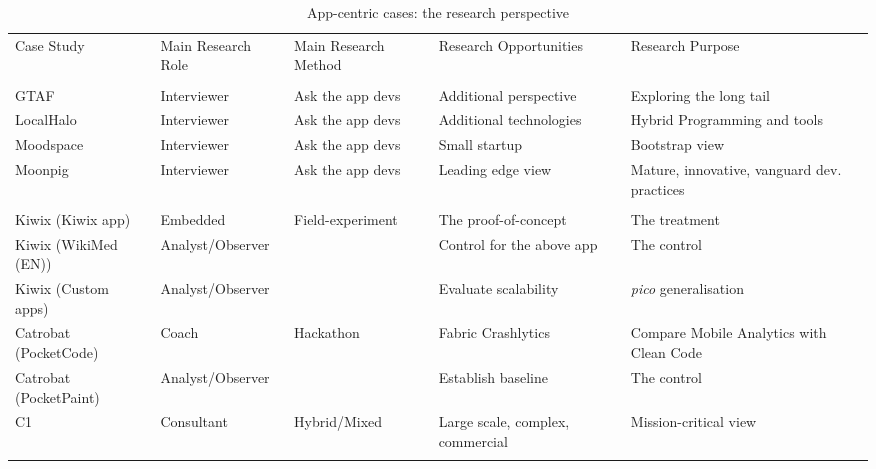 \begin{table}
    \centering
    \tabcolsep=0.06cm
    \tiny
    \begin{tabular}{lllp{3.5cm}p{3.5cm}}\toprule
    Case Study                 & Main Research Role &  Main Research Method   & Research Opportunities             & Research Purpose \\
    \arrayrulecolor{blue!70}\midrule
    \multicolumn{5}{c}{{\large Interviews}} \\    
    GTAF                       & Interviewer        & Ask the app devs & Additional perspective & Exploring the long tail \\
    LocalHalo                  & Interviewer        & Ask the app devs & Additional technologies & Hybrid Programming and tools \\
    Moodspace                  & Interviewer        & Ask the app devs & Small startup &Bootstrap view \\
    Moonpig                    & Interviewer        & Ask the app devs & Leading edge view & Mature, innovative, vanguard dev. practices \\
    \arrayrulecolor{blue!70}\midrule
    \multicolumn{5}{c}{{\large Interventions}} \\
    Kiwix (Kiwix app)          & Embedded           & Field-experiment   & The proof-of-concept      & The treatment \\ 
    Kiwix (WikiMed (EN))       & Analyst/Observer   &                    & Control for the above app & The control  \\
    Kiwix (Custom apps)        & Analyst/Observer   &                    & Evaluate scalability      & \textit{pico} generalisation \\
    \arrayrulecolor{blue!20}\midrule
    Catrobat (PocketCode)      & Coach              & Hackathon   & Fabric Crashlytics        & Compare Mobile Analytics with Clean Code \\
    Catrobat (PocketPaint)     & Analyst/Observer   &                    & Establish baseline        & The control  \\
     \midrule
    C1                         & Consultant         & Hybrid/Mixed & Large scale, complex, commercial & Mission-critical view \\
    \arrayrulecolor{black}\bottomrule
    \end{tabular}
    \caption{App-centric cases: the research perspective}
    \label{tab:app-centric-studies-research-perspective}
\end{table}

